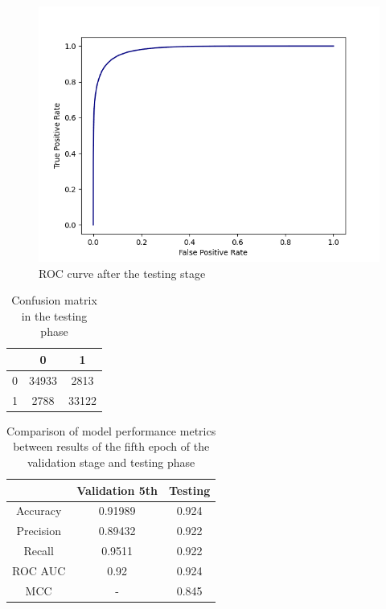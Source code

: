 \documentclass[12pt]{article}
\begin{document}
	\begin{figure}[h!]
		\centering
		\includegraphics[scale=0.7]{testing_0_3068.png}

		\caption{ ROC curve after the testing stage}
		\label{figure:SLP003testing}
	\end{figure}

	\begin{table}[h!]
		\caption{Confusion matrix in the testing phase}
		\vspace{0.2cm}
		\centering
		\begin{tabular}{ | c | c c | }
			\hline 
			& 0 & 1 \\
			\hline  
			0 & 34933 & 2813 \\
			1 & 2788 & 33122 \\
			\hline    
		\end{tabular}
		\label{table:SLP003confusionMatrixTesting}
	\end{table}

	\begin{table}[h!]
		\caption{Comparison of model performance metrics between 
		results of the fifth epoch of the validation stage and 
		testing phase}
		\vspace{0.2cm}
		\centering
		\begin{tabular}{ | c c c | }
			\hline 
			& Validation 5th & Testing \\
			\hline
			Accuracy & 0.91989 & 0.924 \\
			Precision & 0.89432 & 0.922 \\
			Recall & 0.9511 & 0.922 \\
			ROC AUC & 0.92 & 0.924 \\
			MCC & - & 0.845 \\
			\hline 
		\end{tabular}
		\label{table:SLP003metricsTesting}
	\end{table}
\end{document}
